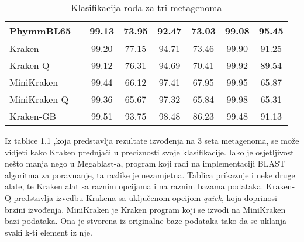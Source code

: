 \documentclass[times, utf8, zavrsni]{fer}
\begin{document}
{\begin{table}[htb]
{\begin{tabular}{|llcccccc|}
			PhymmBL65             & \multicolumn{1}{l|}{} & \multicolumn{1}{c|}{99.13}    & \multicolumn{1}{c|}{73.95}      & \multicolumn{1}{c|}{92.47}    & \multicolumn{1}{c|}{73.03}      & \multicolumn{1}{c|}{99.08}    & 95.45                            \\ \hline
			Kraken                & \multicolumn{1}{l|}{} & \multicolumn{1}{c|}{99.20}    & \multicolumn{1}{c|}{77.15}      & \multicolumn{1}{c|}{94.71}    & \multicolumn{1}{c|}{73.46}      & \multicolumn{1}{c|}{99.90}    & 91.25                            \\ \hline
			Kraken-Q              & \multicolumn{1}{l|}{} & \multicolumn{1}{c|}{99.12}    & \multicolumn{1}{c|}{76.31}      & \multicolumn{1}{c|}{94.69}    & \multicolumn{1}{c|}{70.41}      & \multicolumn{1}{c|}{99.92}    & 89.54                            \\ \hline
			MiniKraken            & \multicolumn{1}{l|}{} & \multicolumn{1}{c|}{99.44}    & \multicolumn{1}{c|}{66.12}      & \multicolumn{1}{c|}{97.41}    & \multicolumn{1}{c|}{67.95}      & \multicolumn{1}{c|}{99.95}    & 65.87                            \\ \hline
			MiniKraken-Q          & \multicolumn{1}{l|}{} & \multicolumn{1}{c|}{99.36}    & \multicolumn{1}{c|}{65.67}      & \multicolumn{1}{c|}{97.32}    & \multicolumn{1}{c|}{65.84}      & \multicolumn{1}{c|}{99.98}    & 65.31                            \\ \hline
			Kraken-GB             & \multicolumn{1}{l|}{} & \multicolumn{1}{c|}{99.51}    & \multicolumn{1}{c|}{93.75}      & \multicolumn{1}{c|}{98.48}    & \multicolumn{1}{c|}{86.23}      & \multicolumn{1}{c|}{99.48}    & 91.13                            \\ \hline
		\end{tabular}%
	}
	\caption{Klasifikacija roda za tri metagenoma}
	\label{StatRez}
\end{table}

Iz tablice 1.1 ,koja predstavlja rezultate izvođenja na 3 seta metagenoma, se može vidjeti kako Kraken prednjači u preciznosti svoje klasifikacije. Iako je osjetljivost nešto manja nego u Megablast-a, program koji radi na implementaciji BLAST algoritma za poravnanje, ta razlike je nezamjetna. Tablica prikazuje i neke druge alate, te Kraken alat sa raznim opcijama i na raznim bazama podataka. Kraken-Q predstavlja izvedbu Krakena sa uključenom opcijom \textit{quick}, koja doprinosi brzini izvođenja. MiniKraken je Kraken program koji se izvodi na MiniKraken bazi podataka. Ona je stvorena iz originalne baze podataka tako da se uklanja svaki k-ti element iz nje.

}
\end{document}
